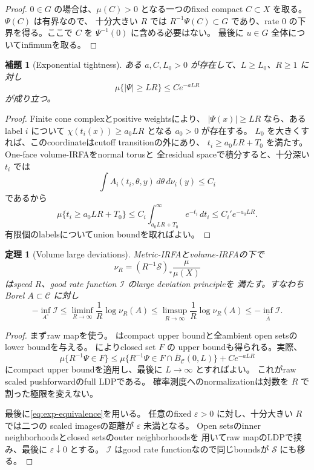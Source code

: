 \documentclass[11pt,a4paper]{ltjsarticle}
\newcommand{\cC}{\mathcal C}
\newcommand{\cI}{\mathcal I}
\newcommand{\cS}{\mathcal S}
\theoremstyle{plain}
\newtheorem{theorem}{定理}[section]
\newtheorem{lemma}[lemma]{補題}
\theoremstyle{definition}
\theoremstyle{remark}
\begin{document}
\begin{proof}
$0\in G$ の場合は、$\mu(C)>0$ となる一つのfixed compact
$C\subset X$ を取る。$\Psi(C)$ は有界なので、
十分大きい $R$ では $R^{-1}\Psi(C)\subset G$ であり、rate $0$
の下界を得る。ここで $C$ を $\Psi^{-1}(0)$ に含める必要はない。
最後に $u\in G$ 全体についてinfimumを取る。
\end{proof}

\begin{lemma}[Exponential tightness]
\label{lem:exp-tight}
ある $a,C,L_0>0$ が存在して、$L\ge L_0$、$R\ge1$ に対し
\[
 \mu\{|\Psi|\ge LR\}\le Ce^{-aLR}
\]
が成り立つ。
\end{lemma}
\begin{proof}
Finite cone complexとpositive weightsにより、
$|\Psi(x)|\ge LR$ なら、あるlabel $i$ について
$\chi(t_i(x))\ge a_0LR$ となる $a_0>0$ が存在する。
$L_0$ を大きくすれば、このcoordinateはcutoff transitionの外にあり、
$t_i\ge a_0LR+T_0$ を満たす。One-face volume-IRFAをnormal torusと
全residual spaceで積分すると、十分深い $t_i$ では
\[
 \int A_i(t_i,\theta,y)\,d\theta\,d\nu_i(y)\le C_i
\]
であるから
\[
 \mu\{t_i\ge a_0LR+T_0\}
 \le C_i\int_{a_0LR+T_0}^{\infty}e^{-t_i}\,dt_i
 \le C_i'e^{-a_0LR}.
\]
有限個のlabelsについてunion boundを取ればよい。
\end{proof}

\begin{theorem}[Volume large deviations]
\label{thm:LDP}
Metric-IRFAとvolume-IRFAの下で
\[
 \nu_R=(R^{-1}\cS)_*\frac{\mu}{\mu(X)}
\]
はspeed $R$、good rate function $\cI$ のlarge deviation principleを
満たす。すなわちBorel $A\subset\cC$ に対し
\[
 -\inf_{A^\circ}\cI
 \le\liminf_{R\to\infty}\frac1R\log\nu_R(A)
 \le\limsup_{R\to\infty}\frac1R\log\nu_R(A)
 \le-\inf_{\overline A}\cI.
\]
\end{theorem}
\begin{proof}
まずraw mapを使う。
 はcompact upper boundと全ambient open setsの
lower boundを与える。 によりclosed set $F$ の
upper boundも得られる。実際、
\[
 \mu\{R^{-1}\Psi\in F\}
 \le
 \mu\{R^{-1}\Psi\in F\cap\overline B_{\cC}(0,L)\}
 +Ce^{-aLR}
\]
にcompact upper boundを適用し、最後に $L\to\infty$ とすればよい。
これがraw scaled pushforwardのfull LDPである。
確率測度へのnormalizationは対数を $R$ で割った極限を変えない。

最後に\eqref{eq:exp-equivalence}を用いる。
任意のfixed $\varepsilon>0$ に対し、十分大きい $R$ では二つの
scaled imagesの距離が $\varepsilon$ 未満となる。
Open setsのinner neighborhoodsとclosed setsのouter neighborhoodsを
用いてraw mapのLDPで挟み、最後に $\varepsilon\downarrow0$ とする。
$\cI$ はgood rate functionなので同じboundsが $\cS$ にも移る。
\end{proof}
\end{document}
